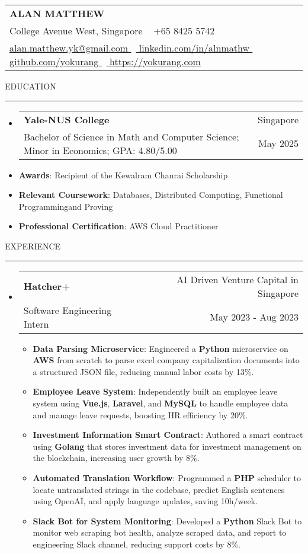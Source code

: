 \documentclass[letterpaper, 11pt]{article}
\makeatletter
\def\sectionlineskip{\medskip}
\def\sectionskip{\medskip}
\def\namesize{\LARGE}
\newcommand{\ResumeHeader}[6]{
  \noindent
  \begin{tabularx}{\textwidth}{>{\centering\arraybackslash}X}
    \namesize\MakeUppercase{\textbf{\fullname}} \\
    #1 \textbar\ #2 \\
    #3 \textbar\ #4 \textbar\ #5 \textbar\ #6 \\
  \end{tabularx}
}
\def \fullname { Alan Matthew }
\def \linkedinlink { https://www.linkedin.com/in/alnmathw }
\def \linkedintext { linkedin.com/in/alnmathw }
\def \phonenumber { +65 8425 5742 }
\def \githublink { https://github.com/yokurang }
\def \githubtext { github.com/yokurang }
\def \emaillink { mailto:alan.matthew.yk@gmail.com }
\def \emailtext { alan.matthew.yk@gmail.com }
\def \websitelink { https://yokurang.com }
\def \websitetext { https://yokurang.com }
\def \address { 28 College Avenue West, Singapore }
\def \headertype {\ResumeHeader}
\def \linkedin {\href{\linkedinlink}{\linkedintext}}
\def \phone {{\phonenumber}}
\def \email {\href{\emaillink}{\emailtext}}
\def \github {\href{\githublink}{\githubtext}}
\def \website {\href{\websitelink}{\websitetext}}
\newcommand{\SectionHeading}[1]{
  \sectionskip
  \raggedright\raggedbottom\MakeUppercase{\large{#1}}
  \sectionlineskip
  \hrule
  \color{black}
}
\newcommand{\ResumeEntryTSDL}[4]{
  \vspace{-1pt}\item
    \begin{tabular*}{\textwidth}[t]{l@{\extracolsep{\fill}}r} 
      \textbf{#1} & #2 \\
      #3 & #4 \\
    \end{tabular*}\vspace{-4pt}
}
\newcommand{\ResumeItem}[2]{
  \item{
    \textbf{#1}{: #2 \vspace{-2pt}}
  }
}
\newcommand{\ResumeSubItem}[2]{\ResumeItem{#1}{#2}\vspace{-4pt}}
\newcommand{\ResumeEntryStart}{\begin{itemize}[leftmargin=2mm, label={}]}
\newcommand{\ResumeEntryEnd}{\end{itemize}\vspace{-7pt}}
\newcommand{\ResumeItemListStart}{\begin{itemize}[leftmargin=5mm, label=$\bullet$]}
\newcommand{\ResumeItemListEnd}{\end{itemize}}
\makeatother
\begin{document}
  \headertype{\address}{\phone}{\email}{\linkedin}{\github}{\website}
  
  \SectionHeading{Education}
  \ResumeEntryStart
    \ResumeEntryTSDL{Yale-NUS College} {Singapore}
    {Bachelor of Science in Math and Computer Science; Minor in Economics; GPA: 4.80/5.00} {May 2025}
    \ResumeSubItem{Awards}{Recipient of the Kewalram Chanrai Scholarship}
    \ResumeSubItem{Relevant Coursework}{Databases, Distributed Computing, Functional Programmingand Proving}
    \ResumeSubItem{Professional Certification}{AWS Cloud Practitioner}
  \ResumeEntryEnd

  \vspace{5pt}

  \SectionHeading{Experience}
  \ResumeEntryStart
    \ResumeEntryTSDL{Hatcher+}{AI Driven Venture Capital in Singapore}{Software Engineering Intern}{May 2023 - Aug 2023}
    \ResumeItemListStart
      \ResumeItem{Data Parsing Microservice}
      {Engineered a \textbf{Python} microservice on \textbf{AWS} from scratch to parse excel company capitalization documents into a structured JSON file, reducing manual labor costs by 13\%.}

      \ResumeItem{Employee Leave System}
      {Independently built an employee leave system using \textbf{Vue.js}, \textbf{Laravel}, and \textbf{MySQL} to handle employee data and manage leave requests, boosting HR efficiency by 20\%.}

      \ResumeItem{Investment Information Smart Contract}
      {Authored a smart contract using \textbf{Golang} that stores investment data for investment management on the blockchain, increasing user growth by 8\%.}

      \ResumeItem{Automated Translation Workflow}
      {Programmed a \textbf{PHP} scheduler to locate untranslated strings in the codebase, predict English sentences using OpenAI, and apply language updates, saving 10h/week.}

      \ResumeItem{Slack Bot for System Monitoring}
      {Developed a \textbf{Python} Slack Bot to monitor web scraping bot health, analyze scraped data, and report to engineering Slack channel, reducing support costs by 8\%.}
    \ResumeItemListEnd
  \ResumeEntryEnd
\end{document}
